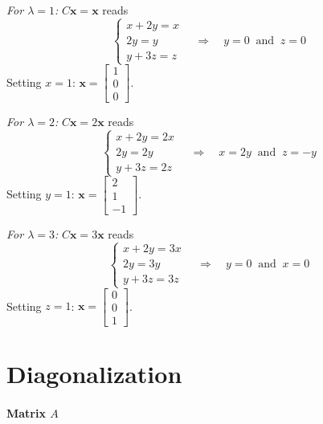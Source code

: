 \documentclass[]{article}
\begin{document}
	\textit{For $\lambda = 1$:} $C\mathbf{x} = \mathbf{x}$ reads
	$$\begin{cases} x + 2y = x \\ 2y = y \\ y + 3z = z \end{cases} \quad \Longrightarrow \quad y = 0 \ \text{ and } \ z = 0$$
	Setting $x = 1$: $\mathbf{x} = \begin{bmatrix} 1 \\ 0 \\ 0 \end{bmatrix}$.

	\textit{For $\lambda = 2$:} $C\mathbf{x} = 2\mathbf{x}$ reads
	$$\begin{cases} x + 2y = 2x \\ 2y = 2y \\ y + 3z = 2z \end{cases} \quad \Longrightarrow \quad x = 2y \ \text{ and } \ z = -y$$
	Setting $y = 1$: $\mathbf{x} = \begin{bmatrix} 2 \\ 1 \\ -1 \end{bmatrix}$.

	\textit{For $\lambda = 3$:} $C\mathbf{x} = 3\mathbf{x}$ reads
	$$\begin{cases} x + 2y = 3x \\ 2y = 3y \\ y + 3z = 3z \end{cases} \quad \Longrightarrow \quad y = 0 \ \text{ and } \ x = 0$$
	Setting $z = 1$: $\mathbf{x} = \begin{bmatrix} 0 \\ 0 \\ 1 \end{bmatrix}$.


	\section{Diagonalization}

	\paragraph{Matrix $A$}\mbox{}
\end{document}

